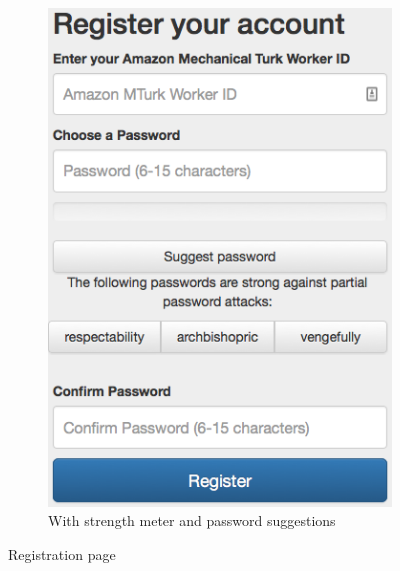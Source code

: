 \begin{figure}[H]
{\begin{subfigure}[t]{0.4\textwidth}
            \includegraphics[width=\textwidth]{Images/1-register-meter-sugg}
            \caption{With strength meter and password suggestions}
            \label{fig:reg-str-sugg}
        \end{subfigure}
      }
      \caption{Registration page}\label{fig:registration}
    \end{figure}

